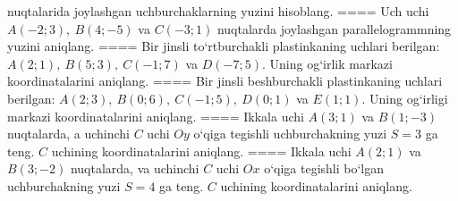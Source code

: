 nuqtalarida joylashgan uchburchaklarning yuzini hisoblang.
====
Uch uchi $A (-2;3), \ B (4;-5) $ va
$C (-3;1)$ nuqtalarda joylashgan parallelogrammning yuzini aniqlang.
====
Bir jinsli to‘rtburchakli plastinkaning uchlari berilgan:
$A (2;1), \ B (5;3), \ C (-1;7) $ va $D (-7;5) $. Uning og‘irlik markazi
koordinatalarini aniqlang.
====
Bir jinsli beshburchakli plastinkaning uchlari berilgan:
$A (2;3), \ B (0;6), \ C (-1;5), \ D (0;1) $ va $E (1;1) $. Uning og‘irligi
markazi koordinatalarini aniqlang.
====
Ikkala uchi $A (3;1) $ va $B (1;-3) $ nuqtalarda, a
uchinchi $C$ uchi $Oy$ o‘qiga tegishli uchburchakning
yuzi $S=3$ ga teng. $C$ uchining koordinatalarini aniqlang.
====
Ikkala uchi $A (2;1) $ va $B (3;-2) $ nuqtalarda, va
uchinchi $C$ uchi $Ox$ o‘qiga tegishli bo‘lgan uchburchakning
yuzi $S=4$ ga teng. $C$ uchining koordinatalarini aniqlang.